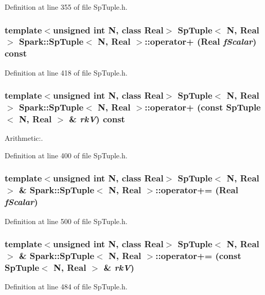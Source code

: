Definition at line 355 of file Sp\-Tuple.h.
\subsubsection{\setlength{\rightskip}{0pt plus 5cm}template$<$unsigned int N, class Real$>$ {\bf Sp\-Tuple}$<$ N, Real $>$ {\bf Spark::Sp\-Tuple}$<$ N, Real $>$::operator+ (Real {\em f\-Scalar}) const}\label{classSpark_1_1SpTuple_a17}


Definition at line 418 of file Sp\-Tuple.h.
\subsubsection{\setlength{\rightskip}{0pt plus 5cm}template$<$unsigned int N, class Real$>$ {\bf Sp\-Tuple}$<$ N, Real $>$ {\bf Spark::Sp\-Tuple}$<$ N, Real $>$::operator+ (const {\bf Sp\-Tuple}$<$ N, Real $>$ \& {\em rk\-V}) const}\label{classSpark_1_1SpTuple_a15}


Arithmetic:. 

Definition at line 400 of file Sp\-Tuple.h.
\subsubsection{\setlength{\rightskip}{0pt plus 5cm}template$<$unsigned int N, class Real$>$ {\bf Sp\-Tuple}$<$ N, Real $>$ \& {\bf Spark::Sp\-Tuple}$<$ N, Real $>$::operator+= (Real {\em f\-Scalar})}\label{classSpark_1_1SpTuple_a24}


Definition at line 500 of file Sp\-Tuple.h.
\subsubsection{\setlength{\rightskip}{0pt plus 5cm}template$<$unsigned int N, class Real$>$ {\bf Sp\-Tuple}$<$ N, Real $>$ \& {\bf Spark::Sp\-Tuple}$<$ N, Real $>$::operator+= (const {\bf Sp\-Tuple}$<$ N, Real $>$ \& {\em rk\-V})}\label{classSpark_1_1SpTuple_a22}


Definition at line 484 of file Sp\-Tuple.h.
